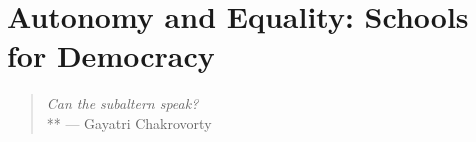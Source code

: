 




\section[Autonomy and Equality]{Autonomy and Equality: Schools for Democracy}

\begin{quote}
	\emph{Can the subaltern speak?}
	\\**
	--- Gayatri Chakrovorty \citet{Spivak-1988-aa}
\end{quote}

